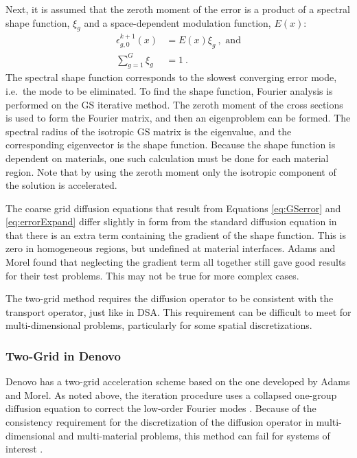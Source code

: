 Next, it is assumed that the zeroth moment of the error is a product of a spectral shape function, $\xi_g$ and a space-dependent modulation function, $E(x)$:
%
\begin{align}
  \epsilon_{g,0}^{k+1}(x) &= E(x)\xi_{g} \:, \text{ and} \label{eq:errorExpand} \\
  \sum_{g=1}^{G} \xi_{g} &= 1 \:.
\end{align} 
%
The spectral shape function corresponds to the slowest converging error mode, i.e.\ the mode to be eliminated. To find the shape function, Fourier analysis is performed on the GS iterative method. The zeroth moment of the cross sections is used to form the Fourier matrix, and then an eigenproblem can be formed. The spectral radius of the isotropic GS matrix is the eigenvalue, and the corresponding eigenvector is the shape function. Because the shape function is dependent on materials, one such calculation must be done for each material region. Note that by using the zeroth moment only the isotropic component of the solution is accelerated.

The coarse grid diffusion equations that result from Equations \eqref{eq:GSerror} and \eqref{eq:errorExpand} differ slightly in form from the standard diffusion equation in that there is an extra term containing the gradient of the shape function. This is zero in homogeneous regions, but undefined at material interfaces. Adams and Morel found that neglecting the gradient term all together still gave good results for their test problems. This may not be true for more complex cases.

The two-grid method requires the diffusion operator to be consistent with the transport operator, just like in DSA. This requirement can be difficult to meet for multi-dimensional problems, particularly for some spatial discretizations. 

\subsubsection{Two-Grid in Denovo}
\label{sec:TTG}
Denovo has a two-grid acceleration scheme based on the one developed by Adams and Morel. As noted above, the iteration procedure uses a collapsed one-group diffusion equation to correct the low-order Fourier modes \cite{Adams1993}. Because of the consistency requirement for the discretization of the diffusion operator in multi-dimensional and multi-material problems, this method can fail for systems of interest \cite{Evans2009d}. 

